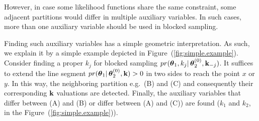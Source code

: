 However, in case some likelihood functions share the same constraint, some 
adjacent partitions would differ in multiple auxiliary variables.
In such cases, more than one auxiliary variable should be used in blocked sampling.

Finding such auxiliary variables has a simple geometric interpretation. As 
such, we explain it by a simple 
example depicted in Figure~(\ref{fig:simple.example}).
Consider finding a proper $k_j$ 
for blocked sampling $pr(\boldsymbol\theta_1, k_j | \, 
\boldsymbol\theta_2^{(0)}, \textbf{k}_{-j})$. 
It suffices to extend the line segment $pr(\boldsymbol\theta_1 | \, 
\boldsymbol\theta_2^{(0)}, \textbf{k})>0$ in two sides to reach the point $x$ or 
$y$. In this way, the neighboring partition e.g.\ (B) and (C) and consequently 
their corresponding $\textbf{k}$ valuations are detected. 
Finally, the auxiliary variables that differ between (A) and (B) or differ between (A) and (C)) are found ($k_1$ and $k_2$, in the Figure~(\ref{fig:simple.example})). 

